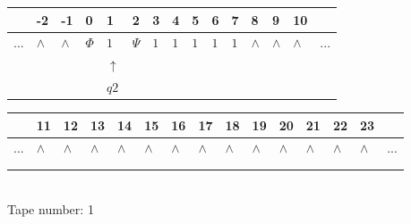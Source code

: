 \documentclass[11pt]{article}
\begin{document}
\begin{table}[H]
\centering
\begin{tabular}{lllllllllllllll}
 & -2 & -1 & 0 & 1 & 2 & 3 & 4 & 5 & 6 & 7 & 8 & 9 & 10 & \\
\hline
$...$ & \multicolumn{1}{|l|}{$\wedge$} & \multicolumn{1}{|l|}{$\wedge$} & \multicolumn{1}{|l|}{$\Phi$} & \multicolumn{1}{|l|}{$1$} & \multicolumn{1}{|l|}{$\Psi$} & \multicolumn{1}{|l|}{$1$} & \multicolumn{1}{|l|}{$1$} & \multicolumn{1}{|l|}{$1$} & \multicolumn{1}{|l|}{$1$} & \multicolumn{1}{|l|}{$1$} & \multicolumn{1}{|l|}{$\wedge$} & \multicolumn{1}{|l|}{$\wedge$} & \multicolumn{1}{|l|}{$\wedge$} & $...$\\
\hline
&  &  &  & $\uparrow$ &  &  &  &  &  &  &  &  &  &  \\
&  &  &  & $ q2 $ &  &  &  &  &  &  &  &  &  &  \\
\end{tabular}
\begin{tabular}{lllllllllllllll}
 & 11 & 12 & 13 & 14 & 15 & 16 & 17 & 18 & 19 & 20 & 21 & 22 & 23 & \\
\hline
$...$ & \multicolumn{1}{|l|}{$\wedge$} & \multicolumn{1}{|l|}{$\wedge$} & \multicolumn{1}{|l|}{$\wedge$} & \multicolumn{1}{|l|}{$\wedge$} & \multicolumn{1}{|l|}{$\wedge$} & \multicolumn{1}{|l|}{$\wedge$} & \multicolumn{1}{|l|}{$\wedge$} & \multicolumn{1}{|l|}{$\wedge$} & \multicolumn{1}{|l|}{$\wedge$} & \multicolumn{1}{|l|}{$\wedge$} & \multicolumn{1}{|l|}{$\wedge$} & \multicolumn{1}{|l|}{$\wedge$} & \multicolumn{1}{|l|}{$\wedge$} & $...$\\
\hline
&  &  &  &  &  &  &  &  &  &  &  &  &  &  \\
&  &  &  &  &  &  &  &  &  &  &  &  &  &  \\
\end{tabular}
\\
Tape number: 1
\noindent\makebox[\linewidth]{\hdashrule{\textwidth}{1pt}{1pt}}\end{table}
\end{document}

